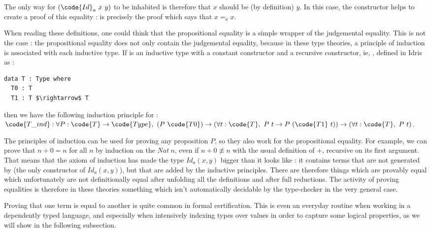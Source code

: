 The only way for $(\code{Id}_a\ x\ y)$ to be inhabited is therefore that $x$ should be
(by definition) $y$. In this case, the constructor  helps to create a
proof of this equality :  is precisely the proof which says that
$x=_ax$. 

When reading these definitions, one could think that the propositional equality is a simple wrapper of the judgemental equality. This is not the case : the propositional equality does not only contain the judgemental equality, because in these type theories, a principle of induction is associated with each inductive type. If  is an inductive type with a constant constructor and a recursive constructor, ie, , defined in Idris as : 

\begin{lstlisting}
data T : Type where
  T0 : T
  T1 : T $\rightarrow$ T          
\end{lstlisting}

then we have the following induction principle for : \\
$\code{T\_ind} : \forall P:\code{T} \rightarrow \code{Type},\ (P\ \code{T0}) \rightarrow (\forall t:\code{T},\ P\ t \rightarrow P\ (\code{T1}\ t)) \rightarrow (\forall t:\code{T},\ P\ t)$.

The principles of induction can be used for proving any proposition $P$, so they also work for the propositional equality. For example, we can prove that $n+0 = n$ for all $n$ by induction on the $Nat\ n$, even if $n+0 \not\equiv n$ with the usual definition of $+$, recursive on its first argument. That means that the axiom of induction has made the type $Id_{a}(x,y)$ bigger than it looks like : it contains terms that are not generated by  (the only constructor of $Id_{a}(x,y)$), but that are added by the inductive principles. There are therefore things which are provably equal which unfortunately are not definitionally equal after unfolding all the definitions and after full reductions. The activity of proving equalities is therefore in these theories something which isn't automatically decidable by the type-checker in the very general case.

Proving that one term is equal to another is quite common
in formal certification. This is even an everyday routine when working in a dependently typed language, and especially when intensively indexing types over values in order to capture some logical properties, as we will show in the following subsection.


